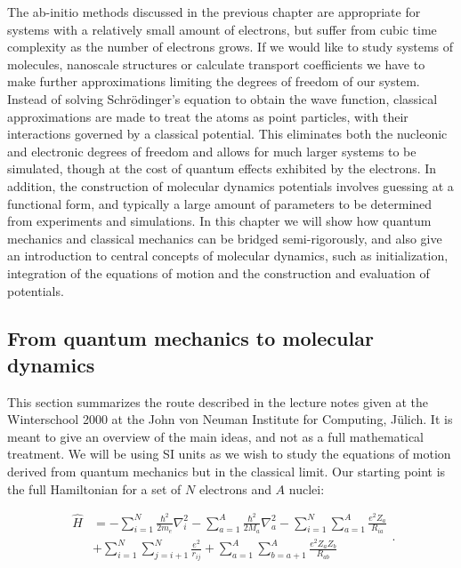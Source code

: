 The ab-initio methods discussed in the previous chapter
are appropriate for systems with a relatively small amount of electrons,
but suffer from cubic time complexity as the number of electrons grows.
If we would like to study systems of molecules, nanoscale structures
or calculate transport coefficients we have to make further approximations
limiting the degrees of freedom of our system.
Instead of solving Schr\"{o}dinger's equation to obtain
the wave function, classical approximations are made to
treat the atoms as point particles, with their interactions
governed by a classical potential. This eliminates both the nucleonic
and electronic degrees of freedom and allows for much larger systems
to be simulated, though at the cost of quantum effects
exhibited by the electrons. In addition, the construction
of molecular dynamics potentials involves guessing at a functional
form, and typically a large amount of parameters to be determined
from experiments and simulations.
In this chapter we will show how quantum mechanics
and classical mechanics can be bridged semi-rigorously,
and also give an introduction to central concepts of molecular dynamics,
such as initialization, integration of the equations of motion
and the construction and evaluation of potentials.

\subsection{From quantum mechanics to molecular dynamics}
This section summarizes the route described in the lecture notes
\parencite[Marx, Dominik and Hutter, J\"{o}rg][pages 1-10]{marx2000}
given at the Winterschool 2000 at the John von Neuman Institute
for Computing, J\"{u}lich.
It is meant to give an overview of the main ideas,
and not as a full mathematical treatment.
We will be using SI units as we wish to study the equations of motion
derived from quantum mechanics but in the classical limit.
Our starting point is the full Hamiltonian 
for a set of $N$ electrons and $A$ nuclei:

\begin{equation}
    \begin{split}
        \hat{H}
        &= -\sum_{i=1}^N \frac{\hbar^2}{2m_e} \nabla_i^2
        -\sum_{a=1}^A \frac{\hbar^2}{2M_a} \nabla_a^2
        -\sum_{i=1}^N \sum_{a=1}^A \frac{e^2 Z_a}{R_{ia}} \\
        &+ \sum_{i=1}^N \sum_{j=i+1}^N \frac{e^2}{r_{ij}}
        + \sum_{a=1}^A \sum_{b=a+1}^A \frac{e^2 Z_a Z_b}{R_{ab}}
    \end{split} .
\end{equation}

